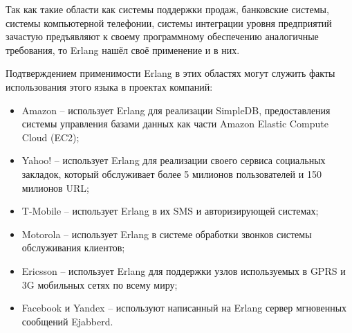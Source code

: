 \begin{par}
Так как такие области как системы поддержки продаж, банковские системы, системы компьютерной
телефонии, системы интеграции уровня предприятий зачастую предъявляют к своему программному
обеспечению аналогичные требования, то Erlang нашёл своё применение и в них.
\end{par}

Подтверждением применимости Erlang в этих областях могут служить факты использования этого языка в
проектах компаний:
\begin{itemize}
	\item{} Amazon -- использует Erlang для реализации SimpleDB, предоставления системы
        управления базами данных как части Amazon Elastic Compute Cloud (EC2);
	\item{} Yahoo! -- использует Erlang для реализации своего сервиса социальных закладок,
    который обслуживает более 5 милионов пользователей и 150 милионов URL;
	\item{} T-Mobile -- использует Erlang в их SMS и авторизирующей системах;
	\item{} Motorola -- использует Erlang в системе обработки звонков системы обслуживания клиентов;
	\item{} Ericsson -- использует Erlang для поддержки узлов используемых в GPRS и 3G
    мобильных сетях по всему миру;
	\item{} Facebook и Yandex -- используют написанный на Erlang сервер мгновенных
    сообщений Ejabberd.
\end{itemize}

